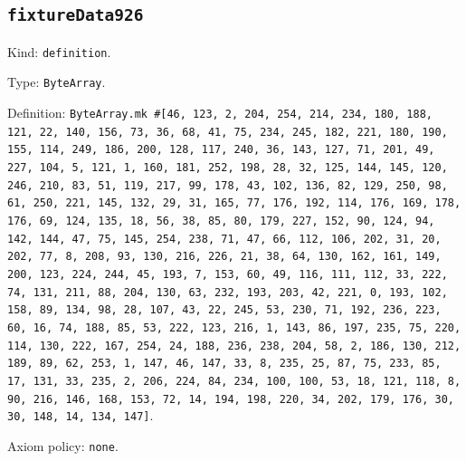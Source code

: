 \documentclass[11pt]{article}
\begin{document}
\subsection*{\texttt{fixtureData926}}
\noindent Kind: \texttt{definition}.\par
\noindent Type: \texttt{ByteArray}.\par
\noindent Definition: \texttt{ByteArray.mk \#[46, 123, 2, 204, 254, 214, 234, 180, 188, 121, 22, 140, 156, 73, 36, 68, 41, 75, 234, 245, 182, 221, 180, 190, 155, 114, 249, 186, 200, 128, 117, 240, 36, 143, 127, 71, 201, 49, 227, 104, 5, 121, 1, 160, 181, 252, 198, 28, 32, 125, 144, 145, 120, 246, 210, 83, 51, 119, 217, 99, 178, 43, 102, 136, 82, 129, 250, 98, 61, 250, 221, 145, 132, 29, 31, 165, 77, 176, 192, 114, 176, 169, 178, 176, 69, 124, 135, 18, 56, 38, 85, 80, 179, 227, 152, 90, 124, 94, 142, 144, 47, 75, 145, 254, 238, 71, 47, 66, 112, 106, 202, 31, 20, 202, 77, 8, 208, 93, 130, 216, 226, 21, 38, 64, 130, 162, 161, 149, 200, 123, 224, 244, 45, 193, 7, 153, 60, 49, 116, 111, 112, 33, 222, 74, 131, 211, 88, 204, 130, 63, 232, 193, 203, 42, 221, 0, 193, 102, 158, 89, 134, 98, 28, 107, 43, 22, 245, 53, 230, 71, 192, 236, 223, 60, 16, 74, 188, 85, 53, 222, 123, 216, 1, 143, 86, 197, 235, 75, 220, 114, 130, 222, 167, 254, 24, 188, 236, 238, 204, 58, 2, 186, 130, 212, 189, 89, 62, 253, 1, 147, 46, 147, 33, 8, 235, 25, 87, 75, 233, 85, 17, 131, 33, 235, 2, 206, 224, 84, 234, 100, 100, 53, 18, 121, 118, 8, 90, 216, 146, 168, 153, 72, 14, 194, 198, 220, 34, 202, 179, 176, 30, 30, 148, 14, 134, 147]}.\par
\noindent Axiom policy: \texttt{none}.\par
\end{document}
